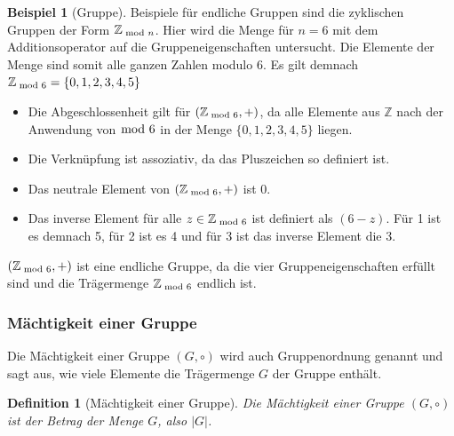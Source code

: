 \documentclass[12pt,a4paper, usenames, dvipsnames]{article}
\theoremstyle{mystyle}
\newtheorem{definition}{Definition}
\theoremstyle{definition}
\newtheorem{bsp}{Beispiel}[definition]
\begin{document}
\begin{bsp}[Gruppe]

Beispiele für endliche Gruppen sind die zyklischen Gruppen der Form $\mathbb{Z}_{\hspace*{-0.3em}\mod n}$. Hier wird die Menge für $n=6$ mit dem Additionsoperator auf die Gruppeneigenschaften untersucht. Die Elemente der Menge sind somit alle ganzen Zahlen modulo 6. Es gilt demnach $\mathbb{Z}_{\hspace*{-0.3em}\mod 6}=\{0,1,2,3,4,5\}$
\begin{itemize}
\item Die Abgeschlossenheit gilt für $(\mathbb{Z}_{\hspace*{-0.3em}\mod 6}, +)$, da alle Elemente aus $\mathbb{Z}$ nach der Anwendung von $\hspace*{-0.6em} \mod 6$ in der Menge $\{0,1,2,3,4,5\}$ liegen.
\item Die Verknüpfung ist assoziativ, da das Pluszeichen so definiert ist.
\item Das neutrale Element von $(\mathbb{Z}_{\hspace*{-0.3em}\mod 6}, +)$ ist $0$.
\item Das inverse Element für alle $z \in \mathbb{Z}_{\hspace*{-0.3em}\mod 6}$ ist definiert als $(6-z)$. Für 1 ist es demnach 5, für 2 ist es 4 und für 3 ist das inverse Element die 3.
\end{itemize}

$(\mathbb{Z}_{\hspace*{-0.3em}\mod 6}, +)$ ist eine endliche Gruppe, da die vier Gruppeneigenschaften erfüllt sind und die Trägermenge $\mathbb{Z}_{\hspace*{-0.3em}\mod 6}$ endlich ist.

\end{bsp}

\subsubsection*{Mächtigkeit einer Gruppe}

\label{Abschnitt_MächtigkeitGruppe}

Die Mächtigkeit einer Gruppe $(G, \circ)$ wird auch Gruppenordnung genannt und sagt aus, wie viele Elemente die Trägermenge $G$ der Gruppe enthält.

\begin{definition}[Mächtigkeit einer Gruppe]
Die Mächtigkeit einer Gruppe $(G, \circ)$ ist der Betrag der Menge $G$, also $|G|$. 
\end{definition}
\end{document}
